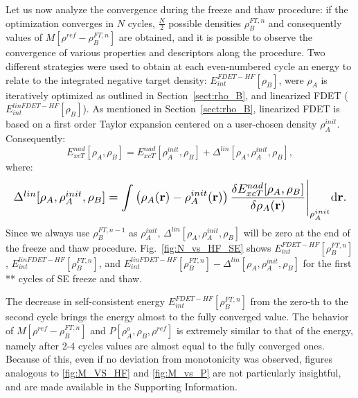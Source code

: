\documentclass[journal=jctcce,manuscript=article, layout=twocolumn]{achemso}
\begin{document}
Let us now analyze the convergence during the freeze and thaw procedure: if the optimization converges in $N$ cycles, $\frac{N}{2}$ possible densities $\rho_B^{FT,n}$ and consequently values of $M[\rho^{ref} - \rho^{FT,n}_{B}]$ are obtained, and it is possible to observe the convergence of various properties and descriptors along the procedure.
Two different strategies were used to obtain at each even-numbered cycle an energy to relate to the integrated negative target density: $E^{FDET-HF}_{int}[\rho_B]$, were $\rho_A$ is iteratively optimized as outlined in Section~\ref{sect:rho_B}, and linearized FDET ($E^{linFDET-HF}_{int}[\rho_B]$). 
As mentioned in Section~\ref{sect:rho_B}, linearized FDET is based on a first order Taylor expansion centered on a user-chosen density $\rho_A^{init}$. Consequently:
\begin{equation}
 E_{xcT}^{nad}[\rho_A,\rho_B] = E_{xcT}^{nad}[\rho_A^{init},\rho_B] + \Delta^{lin}[\rho_A,\rho_A^{init},\rho_B],
\end{equation}
where:
\begin{equation}\label{eq:delta_lin}
    \resizebox{1.0\columnwidth}{!}{%
        $\Delta^{lin}[\rho_A,\rho_A^{init},\rho_B]  = \displaystyle\int \left( \rho_A(\mathbf{r}) -  \rho_A^{init}(\mathbf{r}) \right) \frac{\delta E_{xcT}^{nad}[\rho_A, \rho_B]}{\delta \rho_A(\mathbf{r})}
 \Bigg \vert_{\rho_A^{init}}
 \mathrm{d}\mathbf{r}.$%
        }
\end{equation}
\vspace{0.5ex}
Since we always use $\rho_B^{FT,n-1}$ as $\rho_A^{init}$, $\Delta^{lin}[\rho_A,\rho_A^{init},\rho_B]$ will be zero at the end of the freeze and thaw procedure.
Fig.~\ref{fig:N_vs_HF_SE} shows $E^{FDET-HF}_{int}[\rho_B^{FT,n}]$,  $E^{linFDET-HF}_{int}[\rho_B^{FT,n}]$, and $E^{linFDET-HF}_{int}[\rho_B^{FT,n}] - \Delta^{lin}[\rho_A,\rho_A^{init},\rho_B]$ for the first ** cycles of SE freeze and thaw.

The decrease in self-consistent energy $E^{FDET-HF}_{int}[\rho_B^{FT,n}]$ from the zero-th to the second cycle brings the energy almost to the fully converged value. 
The behavior of $M[\rho^{ref} - \rho^{FT,n}_{B}]$ and $P[\rho^{o}_A, \rho_B, \rho^{ref}]$ is extremely similar to that of the energy, namely after 2-4 cycles values are almost equal to the fully converged ones. Because of this, even if no deviation from monotonicity was observed, figures analogous to \ref{fig:M_VS_HF} and \ref{fig:M_vs_P} are not particularly insightful, and are made available in the Supporting Information. 
\end{document}
